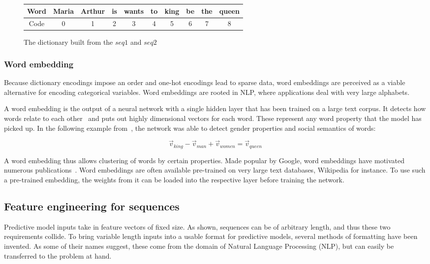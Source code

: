 \begin{figure}
    \centering
    \begin{tabular}{c|ccccccccc}
        Word & Maria & Arthur & is & wants & to & king & be & the & queen\\
        \hline
        Code & 0 & 1 & 2 & 3 & 4 & 5 & 6 & 7 & 8
    \end{tabular}
    \caption{The dictionary built from the $seq1$ and $seq2$}
    \label{tab:dictionary-encoding}
\end{figure}

\subsubsection*{Word embedding}
Because dictionary encodings impose an order and one-hot encodings lead to sparse data, word embeddings are perceived as a viable alternative for encoding categorical variables. Word embeddings are rooted in NLP, where applications deal with very large alphabets.

A word embedding is the output of a neural network with a single hidden layer that has been trained on a large text corpus. It detects how words relate to each other~\cite{web:word-embedding} and puts out highly dimensional vectors for each word. These represent any word property that the model has picked up. In the following example from~\cite{mikolov2013distributed}, the network was able to detect gender properties and social semantics of words:

$$
\vec{v}_{king} - \vec{v}_{man} + \vec{v}_{women} = \vec{v}_{queen}
$$

A word embedding thus allows clustering of words by certain properties. Made popular by Google, word embeddings have motivated numerous publications~\cite{web:ahogrammer, goldberg2014word2vec}. Word embeddings are often available pre-trained on very large text databases, Wikipedia for instance. To use such a pre-trained embedding, the weights from it can be loaded into the respective layer before training the network.

\subsection{Feature engineering for sequences}\label{sec:sequential-feature-engineering}
Predictive model inputs take in feature vectors of fixed size. As shown, sequences can be of arbitrary length, and thus these two requirements collide. To bring variable length inputs into a usable format for predictive models, several methods of formatting have been invented. As some of their names suggest, these come from the domain of Natural Language Processing (NLP), but can easily be transferred to the problem at hand.


